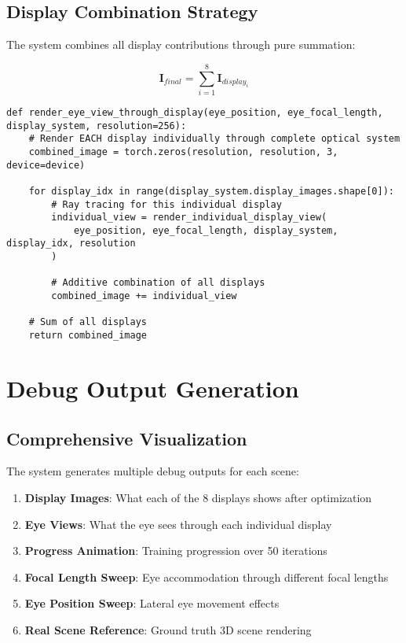 \documentclass[12pt,a4paper]{article}
\begin{document}
\subsection{Display Combination Strategy}

The system combines all display contributions through pure summation:

\begin{equation}
\mathbf{I}_{final} = \sum_{i=1}^{8} \mathbf{I}_{display_i}
\end{equation}

\begin{lstlisting}[caption=Pure Summation Strategy]
def render_eye_view_through_display(eye_position, eye_focal_length, display_system, resolution=256):
    # Render EACH display individually through complete optical system
    combined_image = torch.zeros(resolution, resolution, 3, device=device)
    
    for display_idx in range(display_system.display_images.shape[0]):
        # Ray tracing for this individual display
        individual_view = render_individual_display_view(
            eye_position, eye_focal_length, display_system, display_idx, resolution
        )
        
        # Additive combination of all displays
        combined_image += individual_view
    
    # Sum of all displays
    return combined_image
\end{lstlisting}

\section{Debug Output Generation}

\subsection{Comprehensive Visualization}

The system generates multiple debug outputs for each scene:

\begin{enumerate}
    \item \textbf{Display Images}: What each of the 8 displays shows after optimization
    \item \textbf{Eye Views}: What the eye sees through each individual display
    \item \textbf{Progress Animation}: Training progression over 50 iterations
    \item \textbf{Focal Length Sweep}: Eye accommodation through different focal lengths
    \item \textbf{Eye Position Sweep}: Lateral eye movement effects
    \item \textbf{Real Scene Reference}: Ground truth 3D scene rendering
\end{enumerate}
\end{document}
